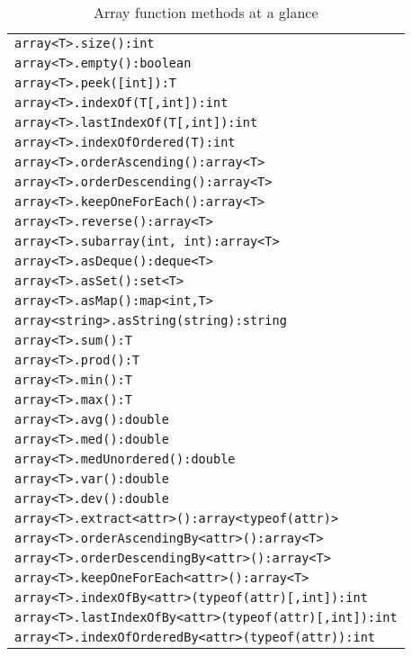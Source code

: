 \begin{table}[htbp]
\centering
\begin{tabular}{|l|}
\hline
\texttt{array<T>.size():int}\\
\texttt{array<T>.empty():boolean}\\
\texttt{array<T>.peek([int]):T}\\
\texttt{array<T>.indexOf(T[,int]):int}\\
\texttt{array<T>.lastIndexOf(T[,int]):int}\\
\texttt{array<T>.indexOfOrdered(T):int}\\
\texttt{array<T>.orderAscending():array<T>}\\
\texttt{array<T>.orderDescending():array<T>}\\
\texttt{array<T>.keepOneForEach():array<T>}\\
\texttt{array<T>.reverse():array<T>}\\
\texttt{array<T>.subarray(int, int):array<T>}\\
\texttt{array<T>.asDeque():deque<T>}\\
\texttt{array<T>.asSet():set<T>}\\
\texttt{array<T>.asMap():map<int,T>}\\
\texttt{array<string>.asString(string):string}\\
\hline
\texttt{array<T>.sum():T}\\
\texttt{array<T>.prod():T}\\
\texttt{array<T>.min():T}\\
\texttt{array<T>.max():T}\\
\texttt{array<T>.avg():double}\\
\texttt{array<T>.med():double}\\
\texttt{array<T>.medUnordered():double}\\
\texttt{array<T>.var():double}\\
\texttt{array<T>.dev():double}\\
\hline
\texttt{array<T>.extract<attr>():array<typeof(attr)>}\\
\texttt{array<T>.orderAscendingBy<attr>():array<T>}\\
\texttt{array<T>.orderDescendingBy<attr>():array<T>}\\
\texttt{array<T>.keepOneForEach<attr>():array<T>}\\
\texttt{array<T>.indexOfBy<attr>(typeof(attr)[,int]):int}\\
\texttt{array<T>.lastIndexOfBy<attr>(typeof(attr)[,int]):int}\\
\texttt{array<T>.indexOfOrderedBy<attr>(typeof(attr)):int}\\
\hline
\end{tabular}
\caption{Array function methods at a glance}
\end{table}

